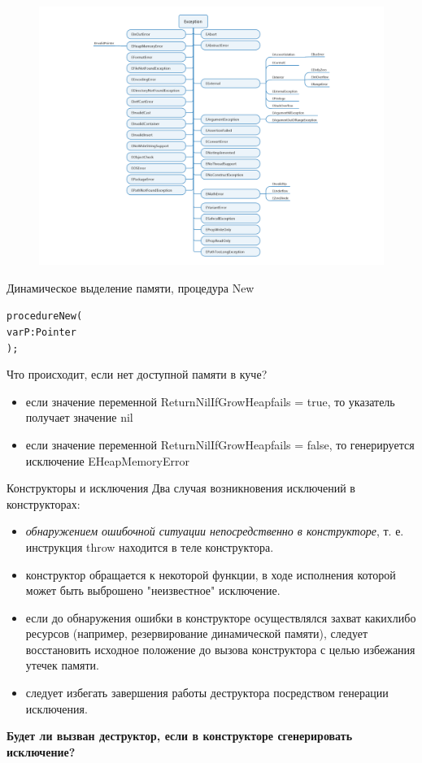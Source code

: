 \documentclass{beamer}
\begin{document}
\begin{frame}
\begin{figure}[h]
\centering
\includegraphics[scale=0.7]{images/lec08-pic08.png}
\end{figure}
\end{frame}

\begin{frame}[fragile]
Динамическое выделение памяти, процедура New
\begin{alltt}
procedure New(
  var P: Pointer
);
\end{alltt}
Что происходит, если нет доступной памяти в куче?
\begin{itemize}
\item если значение переменной ReturnNilIfGrowHeapfails = true, то указатель получает значение nil 
\item если значение переменной ReturnNilIfGrowHeapfails = false, то генерируется исключение EHeapMemoryError
\end{itemize}
\end{frame}

\begin{frame}{Конструкторы и исключения}
Два случая возникновения исключений в конструкторах:
\begin{itemize}
\item \textit{обнаружением ошибочной ситуации непосредственно в конструкторе}, т. е. инструкция throw находится в теле конструктора. 
\item конструктор обращается к некоторой функции, в ходе исполнения которой может быть выброшено "неизвестное" исключение.
\item если до обнаружения ошибки в конструкторе осуществлялся захват какихлибо ресурсов (например, резервирование динамической памяти), следует восстановить исходное положение до вызова конструктора с целью избежания утечек памяти.
\item следует избегать завершения работы деструктора посредством генерации исключения.
\end{itemize}
\textbf{Будет ли вызван деструктор, если в конструкторе сгенерировать исключение?} 
\end{frame}
\end{document}
